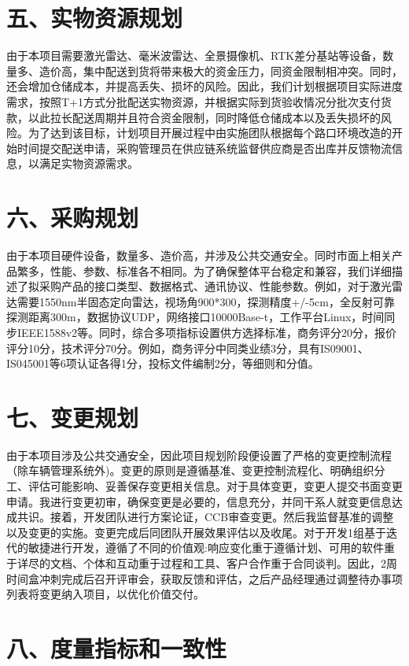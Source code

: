 \documentclass[UTF8]{../computerUniverse}
\begin{document}
\section{五、实物资源规划}


由于本项目需要激光雷达、毫米波雷达、全景摄像机、RTK差分基站等设备，数量多、造价高，集中配送到货将带来极大的资金压力，同资金限制相冲突。同时，还会增加仓储成本，并提高丢失、损坏的风险。因此，我们计划根据项目实际进度需求，按照T+1方式分批配送实物资源，并根据实际到货验收情况分批次支付货款，以此拉长配送周期并且符合资金限制，同时降低仓储成本以及丢失损坏的风险。为了达到该目标，计划项目开展过程中由实施团队根据每个路口环境改造的开始时间提交配送申请，采购管理员在供应链系统监督供应商是否出库并反馈物流信息，以满足实物资源需求。


\section{六、采购规划}

由于本项目硬件设备，数量多、造价高，并涉及公共交通安全。同时市面上相关产品繁多，性能、参数、标准各不相同。为了确保整体平台稳定和兼容，我们详细描述了拟采购产品的接口类型、数据格式、通讯协议、性能参数。例如，对于激光雷达需要1550nm半固态定向雷达，视场角900*300，探测精度+/-5cm，全反射可靠探测距离300m，数据协议UDP，网络接口10000Base-t，工作平台Linux，时间同步IEEE1588v2等。同时，综合多项指标设置供方选择标准，商务评分20分，报价评分10分，技术评分70分。例如，商务评分中同类业绩3分，具有IS09001、IS045001等6项认证各得1分，投标文件编制2分，等细则和分值。



\section{七、变更规划}

由于本项目涉及公共交通安全，因此项目规划阶段便设置了严格的变更控制流程（除车辆管理系统外)。变更的原则是遵循基准、变更控制流程化、明确组织分工、评估可能影响、妥善保存变更相关信息。对于具体变更，变更人提交书面变更申请。我进行变更初审，确保变更是必要的，信息充分，并同干系人就变更信息达成共识。接着，开发团队进行方案论证，CCB审查变更。然后我监督基准的调整以及变更的实施。变更完成后同团队开展效果评估以及收尾。对于开发1组基于迭代的敏捷进行开发，遵循了不同的价值观:响应变化重于遵循计划、可用的软件重于详尽的文档、个体和互动重于过程和工具、客户合作重于合同谈判。因此，2周时间盒冲刺完成后召开评审会，获取反馈和评估，之后产品经理通过调整待办事项列表将变更纳入项目，以优化价值交付。


\section{八、度量指标和一致性}
\end{document}
